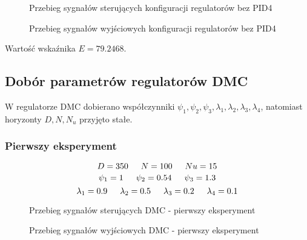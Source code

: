 \ifdefined\CompileFigures
    \begin{figure}[H] 
        \centering
        
        \caption{Przebieg sygnałów sterujących konfiguracji regulatorów bez PID4}
        \label{projekt:zad4:figure:projzadanie4PIDbezu4u}
    \end{figure}
\fi

\ifdefined\CompileFigures
    \begin{figure}[H] 
        \centering
        
        \caption{Przebieg sygnałów wyjściowych konfiguracji regulatorów bez PID4}
        \label{projekt:zad4:figure:projzadanie4PIDbezu4y}
    \end{figure}
\fi
Wartość wskaźnika $E=\num{79.2468}$.

\newpage
\subsection{Dobór parametrów regulatorów DMC}

W regulatorze DMC dobierano współczynniki $\psi_1, \psi_2, \psi_3, \lambda_1, \lambda_2, 
\lambda_3, \lambda_4$, 
natomiast horyzonty $D, N, N_u$ przyjęto stałe.

\subsubsection{Pierwszy eksperyment}

$$D=350 \indent  N=100 \indent  Nu=15$$ 
$$\psi_1=\num{1} \indent \psi_2=\num{0.54} \indent \psi_3=\num{1.3}$$
$$\lambda_1=\num{0.9} \indent \lambda_2=\num{0.5} \indent \lambda_3=\num{0.2} \indent \lambda_4=\num{0.1}$$

\ifdefined\CompileFigures
    \begin{figure}[H] 
        \centering
        
        \caption{Przebieg sygnałów sterujących DMC - pierwszy eksperyment}
        \label{projekt:zad4:figure:projzadanie4DMC1u}
    \end{figure}
\fi

\ifdefined\CompileFigures
    \begin{figure}[H] 
        \centering
        
        \caption{Przebieg sygnałów wyjściowych DMC - pierwszy eksperyment}
        \label{projekt:zad4:figure:projzadanie4DMC1y}
    \end{figure}
\fi

